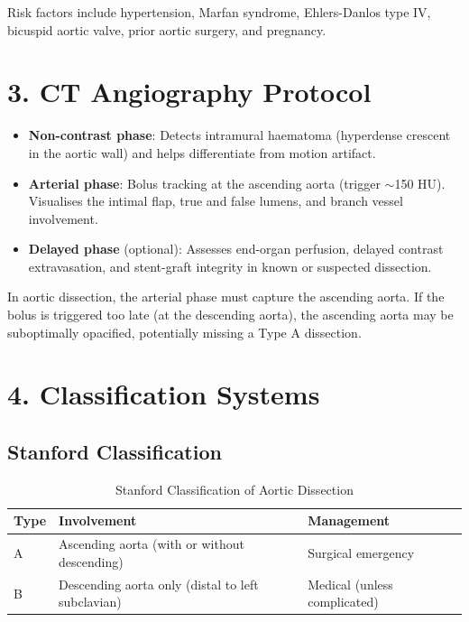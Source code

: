 Risk factors include hypertension, Marfan syndrome, Ehlers-Danlos type IV, bicuspid aortic valve, prior aortic surgery, and pregnancy.


\section{3. CT Angiography Protocol}

\begin{itemize}
  \item \textbf{Non-contrast phase}: Detects intramural haematoma (hyperdense crescent in the aortic wall) and helps differentiate from motion artifact.
  \item \textbf{Arterial phase}: Bolus tracking at the ascending aorta (trigger $\sim$150 HU). Visualises the intimal flap, true and false lumens, and branch vessel involvement.
  \item \textbf{Delayed phase} (optional): Assesses end-organ perfusion, delayed contrast extravasation, and stent-graft integrity in known or suspected dissection.
\end{itemize}

\begin{pearlbox}
In aortic dissection, the arterial phase must capture the ascending aorta. If the bolus is triggered too late (at the descending aorta), the ascending aorta may be suboptimally opacified, potentially missing a Type A dissection.
\end{pearlbox}


\section{4. Classification Systems}

\subsection{Stanford Classification}
\begin{table}[h]
\centering
\begin{tabular}{@{}p{}p{}p{}@{}}
\hline
\textbf{Type} & \textbf{Involvement} & \textbf{Management} \\
\hline
A & Ascending aorta (with or without descending) & Surgical emergency \\
B & Descending aorta only (distal to left subclavian) & Medical (unless complicated) \\
\hline
\end{tabular}
\caption{Stanford Classification of Aortic Dissection}
\end{table}

